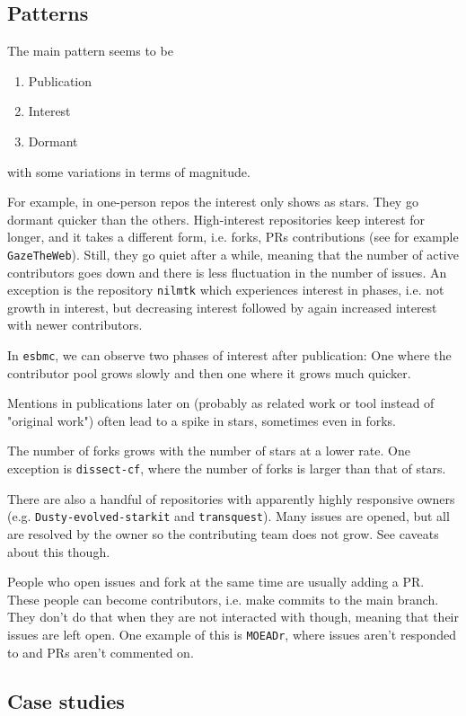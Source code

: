 \documentclass[10pt,a4paper]{scrartcl}
\begin{document}
\subsection*{Patterns}

The main pattern seems to be 
\begin{enumerate}
    \item Publication
    \item Interest
    \item Dormant
\end{enumerate}
with some variations in terms of magnitude.

For example, in one-person repos the interest only shows as stars. They go dormant quicker than the others.
High-interest repositories keep interest for longer, and it takes a different form, i.e. forks, PRs contributions (see for example \verb|GazeTheWeb|). 
Still, they go quiet after a while, meaning that the number of active contributors goes down and there is less fluctuation in the number of issues. 
An exception is the repository \verb|nilmtk| which experiences interest in phases, i.e. not growth in interest, but decreasing interest followed by again increased interest with newer contributors.

In \verb|esbmc|, we can observe two phases of interest after publication: One where the contributor pool grows slowly and then one where it grows much quicker.

Mentions in publications later on (probably as related work or tool instead of "original work") often lead to a spike in stars, sometimes even in forks.

The number of forks grows with the number of stars at a lower rate.
One exception is \verb|dissect-cf|, where the number of forks is larger than that of stars.

There are also a handful of repositories with apparently highly responsive owners (e.g. \verb|Dusty-evolved-starkit| and \verb|transquest|).
Many issues are opened, but all are resolved by the owner so the contributing team does not grow.
See caveats about this though.

People who open issues and fork at the same time are usually adding a PR. These people can become contributors, i.e. make commits to the main branch.
They don't do that when they are not interacted with though, meaning that their issues are left open.
One example of this is \verb|MOEADr|, where issues aren't responded to and PRs aren't commented on.

\subsection*{Case studies}
\end{document}
